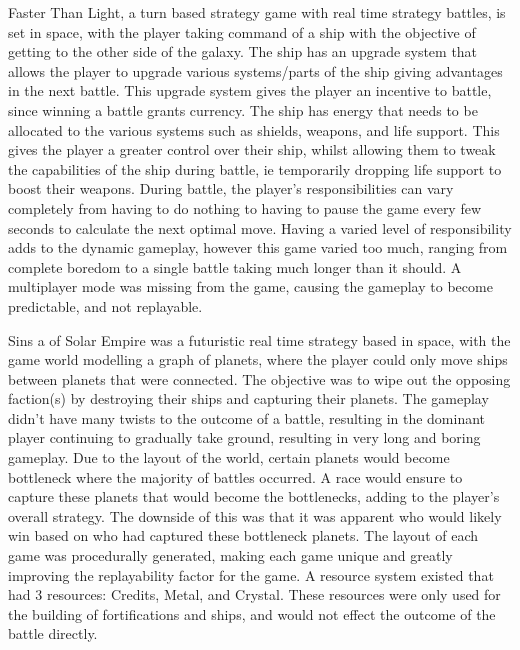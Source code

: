 Faster Than Light, a turn based strategy game with real time strategy battles, is set in space, with the player taking command of a ship with the objective of getting to the other side of the galaxy.
The ship has an upgrade system that allows the player to upgrade various systems/parts of the ship giving advantages in the next battle.
This upgrade system gives the player an incentive to battle, since winning a battle grants currency.
The ship has energy that needs to be allocated to the various systems such as shields, weapons, and life support.
This gives the player a greater control over their ship, whilst allowing them to tweak the capabilities of the ship during battle, ie temporarily dropping life support to boost their weapons.
During battle, the player's responsibilities can vary completely from having to do nothing to having to pause the game every few seconds to calculate the next optimal move. Having a varied level of responsibility adds to the dynamic gameplay, however this game varied too much, ranging from complete boredom to a single battle taking much longer than it should.
A multiplayer mode was missing from the game, causing the gameplay to become predictable, and not replayable.


Sins a of Solar Empire was a futuristic real time strategy based in space, with the game world modelling a graph of planets, where the player could only move ships between planets that were connected. 
The objective was to wipe out the opposing faction(s) by destroying their ships and capturing their planets.
The gameplay didn't have many twists to the outcome of a battle, resulting in the dominant player continuing to gradually take ground, resulting in very long and boring gameplay.
Due to the layout of the world, certain planets would become bottleneck where the majority of battles occurred. 
A race would ensure to capture these planets that would become the bottlenecks, adding to the player's overall strategy.
The downside of this was that it was apparent who would likely win based on who had captured these bottleneck planets.
The layout of each game was procedurally generated, making each game unique and greatly improving the replayability factor for the game.
A resource system existed that had 3 resources: Credits, Metal, and Crystal. 
These resources were only used for the building of fortifications and ships, and would not effect the outcome of the battle directly.


